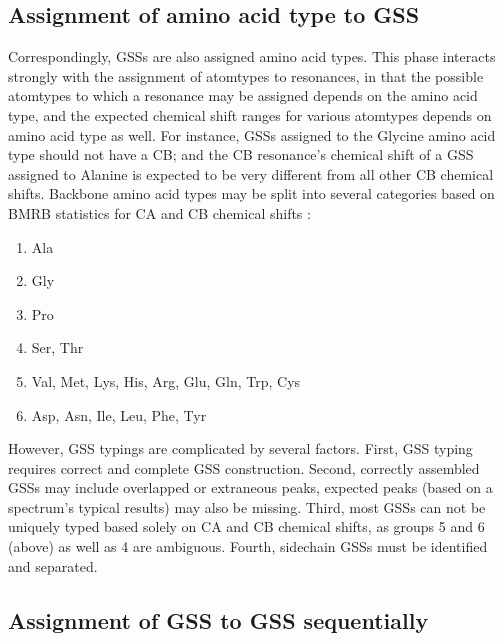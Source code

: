 \subsection{Assignment of amino acid type to GSS}

Correspondingly, GSSs are also assigned amino acid types.  This phase 
interacts strongly with the assignment of atomtypes to resonances, in 
that the possible atomtypes to which a resonance may be assigned depends 
on the amino acid type, and the expected chemical shift ranges for various 
atomtypes depends on amino acid type as well.  For instance, GSSs assigned 
to the Glycine amino acid type should not have a CB; and the CB resonance's 
chemical shift of a GSS assigned to Alanine is expected to be very different 
from all other CB chemical shifts.  Backbone amino acid types may be split 
into several categories \cite{saga} based on BMRB statistics for 
CA and CB chemical shifts \cite{bmrb}:
\begin{enumerate}
  \item Ala
  \item Gly 
  \item Pro
  \item Ser, Thr
  \item Val, Met, Lys, His, Arg, Glu, Gln, Trp, Cys
  \item Asp, Asn, Ile, Leu, Phe, Tyr
\end{enumerate}
However, GSS typings are complicated by several factors.  First, GSS typing 
requires correct and complete GSS construction.  Second, correctly assembled 
GSSs may include overlapped or extraneous peaks, expected peaks (based on a 
spectrum's typical results) may also be missing.  Third, most GSSs can not 
be uniquely typed based solely on CA and CB chemical shifts, as groups 5 and 
6 (above) as well as 4 are ambiguous.  Fourth, sidechain GSSs must be 
identified and separated.

\subsection{Assignment of GSS to GSS sequentially}

